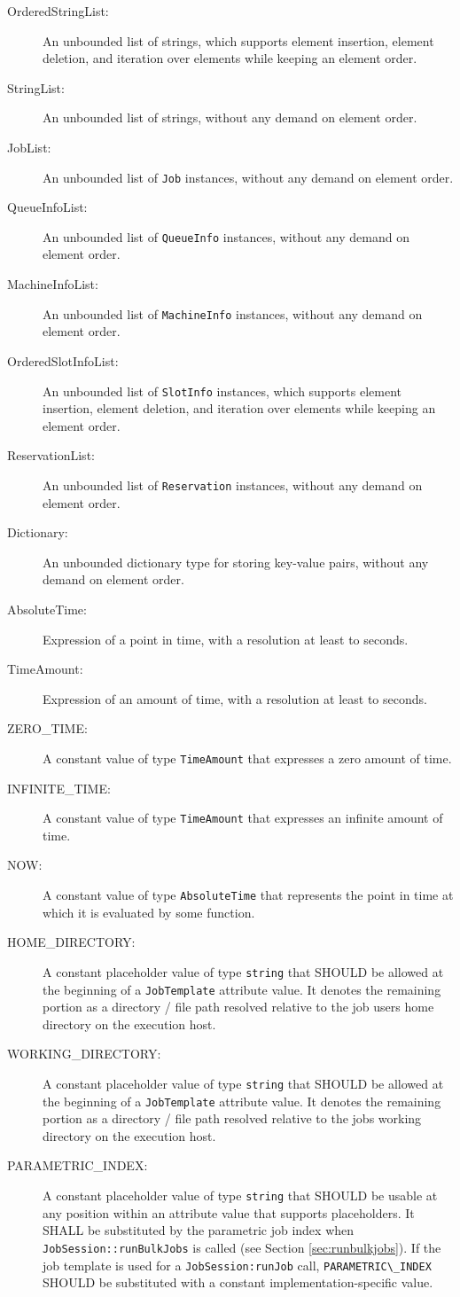 \documentclass{article}
\newcommand{\h}[1]{\lstinline|#1|}
\begin{document}
\begin{description}
\item[OrderedStringList:] An unbounded list of strings, which supports element insertion, element deletion, and iteration over elements while keeping an element order.
\item[StringList:] An unbounded list of strings, without any demand on element order.
\item[JobList:] An unbounded list of \h{Job} instances, without any demand on element order.
\item[QueueInfoList:] An unbounded list of \h{QueueInfo} instances, without any demand on element order.
\item[MachineInfoList:] An unbounded list of \h{MachineInfo} instances, without any demand on element order.
\item[OrderedSlotInfoList:] An unbounded list of \h{SlotInfo} instances, which supports element insertion, element deletion, and iteration over elements while keeping an element order.
\item[ReservationList:] An unbounded list of \h{Reservation} instances, without any demand on element order.
\item[Dictionary:] An unbounded dictionary type for storing key-value pairs, without any demand on element order.
\item[AbsoluteTime:] Expression of a point in time, with a resolution at least to seconds. 
\item[TimeAmount:] Expression of an amount of time, with a resolution at least to seconds.
\item[ZERO\_TIME:] A constant value of type \h{TimeAmount} that expresses a zero amount of time.
\item[INFINITE\_TIME:] A constant value of type \h{TimeAmount} that expresses an infinite amount of time.
\item[NOW:] A constant value of type \h{AbsoluteTime} that represents the point in time at which it is evaluated by some function.
\item[HOME\_DIRECTORY:] A constant placeholder value of type \h{string} that SHOULD be allowed at the beginning of a \h{JobTemplate} attribute value. It denotes the remaining portion as a directory / file path resolved relative to the job users home directory on the execution host.
\item[WORKING\_DIRECTORY:] A constant placeholder value of type \h{string} that SHOULD be allowed at the beginning of a \h{JobTemplate} attribute value. It denotes the remaining portion as a directory / file path resolved relative to the jobs working directory on the execution host.
\item[PARAMETRIC\_INDEX:] A constant placeholder value of type \h{string} that SHOULD be usable at any position within an attribute value that supports placeholders. It SHALL be substituted by the parametric job index when \h{JobSession::runBulkJobs} is called (see Section \ref{sec:runbulkjobs}). If the job template is used for a \h{JobSession:runJob} call, \h{PARAMETRIC\_INDEX} SHOULD be substituted with a constant implementation-specific value.
\end{description}
\end{document}
